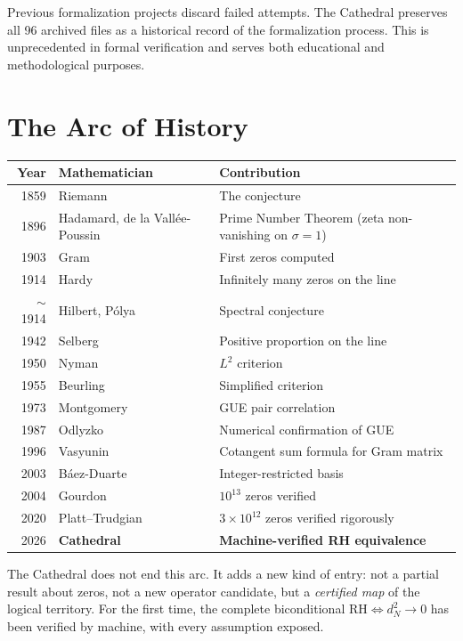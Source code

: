 \documentclass[11pt,a4paper]{article}
\newcommand{\RH}{\ensuremath{\mathrm{RH}}}
\begin{document}
Previous formalization projects discard failed attempts. The
Cathedral preserves all 96 archived files as a historical record
of the formalization process. This is unprecedented in formal
verification and serves both educational and methodological
purposes.

\section{The Arc of History}

\begin{center}
\small
\begin{tabular}{@{}rlp{7cm}@{}}
\toprule
\textbf{Year} & \textbf{Mathematician} & \textbf{Contribution} \\
\midrule
1859 & Riemann & The conjecture \\
1896 & Hadamard, de la Vall\'ee-Poussin & Prime Number Theorem
  (zeta non-vanishing on $\sigma = 1$) \\
1903 & Gram & First zeros computed \\
1914 & Hardy & Infinitely many zeros on the line \\
$\sim$1914 & Hilbert, P\'olya & Spectral conjecture \\
1942 & Selberg & Positive proportion on the line \\
1950 & Nyman & $L^2$ criterion \\
1955 & Beurling & Simplified criterion \\
1973 & Montgomery & GUE pair correlation \\
1987 & Odlyzko & Numerical confirmation of GUE \\
1996 & Vasyunin & Cotangent sum formula for Gram matrix \\
2003 & B\'aez-Duarte & Integer-restricted basis \\
2004 & Gourdon & $10^{13}$ zeros verified \\
2020 & Platt--Trudgian & $3 \times 10^{12}$ zeros verified
  rigorously \\
2026 & \textbf{Cathedral} & \textbf{Machine-verified RH equivalence} \\
\bottomrule
\end{tabular}
\end{center}

The Cathedral does not end this arc. It adds a new kind of entry:
not a partial result about zeros, not a new operator candidate,
but a \emph{certified map} of the logical territory. For the first
time, the complete biconditional $\RH \iff d_N^2 \to 0$ has been
verified by machine, with every assumption exposed.
\end{document}
